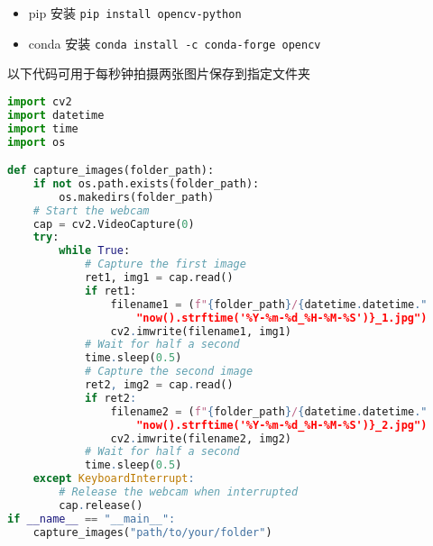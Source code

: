
\begin{issues}
\issueDraft
\end{issues}

\begin{itemize}
\item pip 安装 \verb`pip install opencv-python`
\item conda 安装 \verb`conda install -c conda-forge opencv`
\end{itemize}

以下代码可用于每秒钟拍摄两张图片保存到指定文件夹
\begin{lstlisting}[language=python,caption=camera.py]
import cv2
import datetime
import time
import os

def capture_images(folder_path):
    if not os.path.exists(folder_path):
        os.makedirs(folder_path)
    # Start the webcam
    cap = cv2.VideoCapture(0)
    try:
        while True:
            # Capture the first image
            ret1, img1 = cap.read()
            if ret1:
                filename1 = (f"{folder_path}/{datetime.datetime."
                    "now().strftime('%Y-%m-%d_%H-%M-%S')}_1.jpg")
                cv2.imwrite(filename1, img1)
            # Wait for half a second
            time.sleep(0.5)
            # Capture the second image
            ret2, img2 = cap.read()
            if ret2:
                filename2 = (f"{folder_path}/{datetime.datetime."
                    "now().strftime('%Y-%m-%d_%H-%M-%S')}_2.jpg")
                cv2.imwrite(filename2, img2)
            # Wait for half a second
            time.sleep(0.5)
    except KeyboardInterrupt:
        # Release the webcam when interrupted
        cap.release()
if __name__ == "__main__":
    capture_images("path/to/your/folder")
\end{lstlisting}
